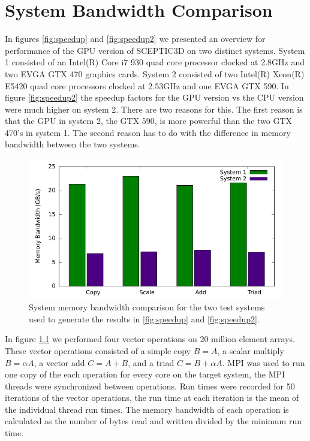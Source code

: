 \chapter{System Bandwidth Comparison}
\label{app:memory_bandwidth}


In figures \ref{fig:speedup} and \ref{fig:speedup2} we presented an overview for performance of the GPU version of SCEPTIC3D on two distinct systems. System 1 consisted of an Intel(R) Core i7 930 quad core processor clocked at 2.8GHz and two EVGA GTX 470 graphics cards. System 2 consisted of two Intel(R) Xeon(R) E5420 quad core processors clocked at 2.53GHz and one EVGA GTX 590. In figure \ref{fig:speedup2} the speedup factors for the GPU version vs the CPU version were much higher on system 2. There are two reasons for this. The first reason is that the GPU in system 2, the GTX 590, is more powerful than the two GTX 470's in system 1. The second reason has to do with the difference in memory bandwidth between the two systems.

\noindent \begin{figure}
\begin{center}
\includegraphics[width=6in]{appb/bandwidth_test.pdf}
\end{center}
\caption[System Memory Bandwidth Comparison]{System memory bandwidth comparison for the two test systems used to generate the results in \ref{fig:speedup} and \ref{fig:speedup2}.}
\label{fig:memory_bandwidth_compare} 
\end{figure} 

In figure \ref{fig:memory_bandwidth_compare} we performed four vector operations on 20 million element arrays. These vector operations consisted of a simple copy $B = A$, a scalar multiply $B = \alpha A$, a vector add $C = A+B$, and a triad $C = B+\alpha A$. MPI was used to run one copy of the each operation for every core on the target system, the MPI threads were synchronized between operations. Run times were recorded for 50 iterations of the vector operations, the run time at each iteration is the mean of the individual thread run times. The memory bandwidth of each operation is calculated as the number of bytes read and written divided by the minimum run time.    



\clearpage
\newpage
